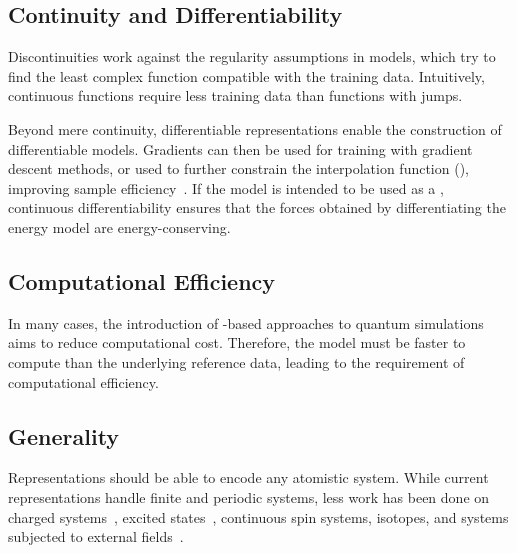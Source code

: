 \subsection{Continuity and Differentiability}

Discontinuities work against the regularity assumptions in \ml models, which try to find the least complex function compatible with the training data.
Intuitively, continuous functions require less training data than functions with jumps. 

Beyond mere continuity, differentiable representations enable the construction of differentiable \ml models. Gradients can then be used for training with gradient descent methods, or used to further constrain the interpolation function (), improving sample efficiency~\cite{lhr2009q,bc2015q,csmt2018q}.
If the \ml model is intended to be used as a \mlp, continuous differentiability ensures that the forces obtained by differentiating the energy model are energy-conserving.

\subsection{Computational Efficiency}

In many cases, the introduction of \ml-based approaches to quantum simulations aims to reduce computational cost. Therefore, the \ml model must be faster to compute than the underlying reference data, leading to the requirement of computational efficiency.

\subsection{Generality}

Representations should be able to encode any atomistic system.
While current representations handle finite and periodic systems, less work has been done on charged systems~\cite{ghsg2015q,nlbt2018q,rag2018q,ns2018q,um2019q,d2020Aq,kfgb2021Bq,pdfg2021q}, excited states~\cite{wm2020Aq,wm2020Bq,wgm2020q,bdrs2005q,wflm2020q}, continuous spin systems, isotopes, and systems subjected to external fields~\cite{gsm2021q,cfl2019q}.

